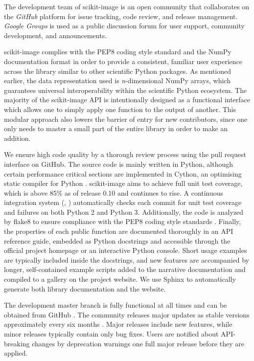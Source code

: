 \documentclass[letterpaper,compsoc,twoside]{IEEEtran}
\begin{document}
The development team of scikit-image is an open community that collaborates on
the \emph{GitHub} \cite{GitHub} platform for issue tracking, code review, and release
management. \emph{Google Groups} \cite{GoogleGroups} is used as a public discussion
forum for user support, community development, and announcements.

scikit-image complies with the PEP8 coding style standard \cite{PEP8} and the NumPy
documentation format \cite{NumpyDoc} in order to provide a consistent, familiar user
experience across the library similar to other scientific Python packages. As
mentioned earlier, the data representation used is \emph{n}-dimensional
NumPy arrays, which guarantees universal interoperability
within the scientific Python ecosystem. The majority of the scikit-image API is
intentionally designed as a functional interface which allows one to simply
apply one function to the output of another. This modular approach also lowers the
barrier of entry for new contributors, since one only needs to master a small
part of the entire library in order to make an addition.

We ensure high code quality by a thorough review process using the pull request
interface on GitHub. The source code is mainly written in Python, although
certain performance critical sections are implemented in Cython, an
optimising static compiler for Python
\cite{Cython}.  scikit-image aims to achieve full unit test coverage, which is above
85\% as of release 0.10 and continues to rise. A continuous integration system
(\cite{TravisCI}, \cite{Coveralls}) automatically checks each commit for unit test
coverage and failures on both Python 2 and Python 3. Additionally, the code is
analyzed by flake8 \cite{flake8} to ensure compliance with the PEP8 coding style
standards \cite{PEP8}. Finally, the properties of each public function are
documented thoroughly in an API reference guide, embedded as Python
docstrings and accessible through the official project homepage or an
interactive
Python console. Short usage examples are
typically included inside the docstrings, and new features are accompanied by longer,
self-contained example scripts added to the narrative documentation and
compiled to a gallery on the project website. We use Sphinx
\cite{Sphinx} to automatically generate both library documentation and the website.

The development master branch is fully functional at all times and can be
obtained from GitHub \cite{SourceCode}. The community releases major updates as
stable versions approximately every six months \cite{Versioning}. Major releases
include new features, while minor releases typically contain only bug fixes.
Users are notified about API-breaking changes by deprecation warnings one full
major release before they are applied.
\end{document}
